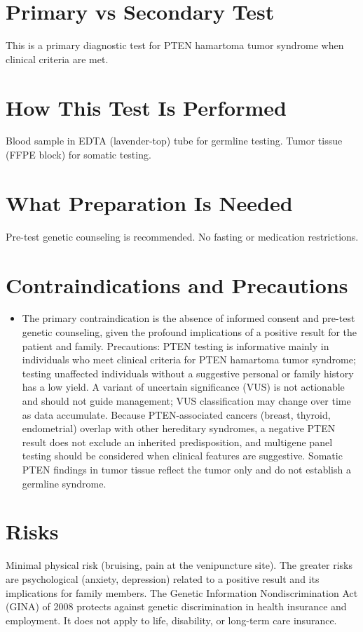 \section*{Primary vs Secondary Test}
This is a primary diagnostic test for PTEN hamartoma tumor syndrome when clinical criteria are met.

\section*{How This Test Is Performed}
Blood sample in EDTA (lavender-top) tube for germline testing. Tumor tissue (FFPE block) for somatic testing.

\section*{What Preparation Is Needed}
Pre-test genetic counseling is recommended. No fasting or medication restrictions.

\section*{Contraindications and Precautions}
\begin{itemize}
  \item The primary contraindication is the absence of informed consent and pre-test genetic counseling, given the profound implications of a positive result for the patient and family. Precautions: PTEN testing is informative mainly in individuals who meet clinical criteria for PTEN hamartoma tumor syndrome; testing unaffected individuals without a suggestive personal or family history has a low yield. A variant of uncertain significance (VUS) is not actionable and should not guide management; VUS classification may change over time as data accumulate. Because PTEN-associated cancers (breast, thyroid, endometrial) overlap with other hereditary syndromes, a negative PTEN result does not exclude an inherited predisposition, and multigene panel testing should be considered when clinical features are suggestive. Somatic PTEN findings in tumor tissue reflect the tumor only and do not establish a germline syndrome.
\end{itemize}
\section*{Risks}
Minimal physical risk (bruising, pain at the venipuncture site). The greater risks are psychological (anxiety, depression) related to a positive result and its implications for family members. The Genetic Information Nondiscrimination Act (GINA) of 2008 protects against genetic discrimination in health insurance and employment. It does not apply to life, disability, or long-term care insurance.

